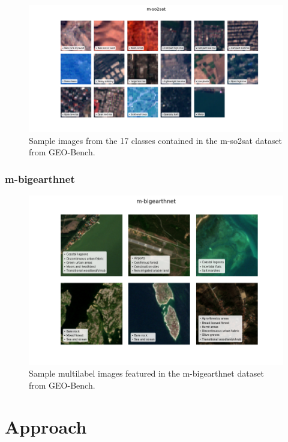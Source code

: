\documentclass[a4paper, oneside, english]{sapthesis}
\begin{document}
\begin{figure}[h]
    \centering
    \includegraphics[width=\textwidth]{img/m-so2sat_image_grid.png}
    \caption{Sample images from the 17 classes contained in the m-so2sat dataset from GEO-Bench.}
    \label{fig:so2satgrid}
\end{figure}


\subsection{m-bigearthnet}


\begin{figure}[h]
    \centering
    \includegraphics[width=\textwidth]{img/m-bigearthnet_image_grid.png}
    \caption{Sample multilabel images featured in the m-bigearthnet dataset from GEO-Bench.}
    \label{fig:bengrid}
\end{figure}


\chapter{Approach} %
\end{document}
